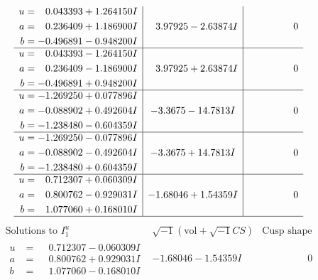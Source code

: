 \documentclass[1p]{elsarticle_modified}
\theoremstyle{definition}
\newcommand{\I}{\sqrt{-1}}
\begin{document}
$$\begin{array}{c|c|c}
\begin{aligned}
u &= \phantom{-}0.043393 + 1.264150 I \\
a &= \phantom{-}0.236409 + 1.186900 I \\
b &= -0.496891 - 0.948200 I\end{aligned}
 & \phantom{-}3.97925 - 2.63874 I & \phantom{-0.000000 } 0 \\ \hline\begin{aligned}
u &= \phantom{-}0.043393 - 1.264150 I \\
a &= \phantom{-}0.236409 - 1.186900 I \\
b &= -0.496891 + 0.948200 I\end{aligned}
 & \phantom{-}3.97925 + 2.63874 I & \phantom{-0.000000 } 0 \\ \hline\begin{aligned}
u &= -1.269250 + 0.077896 I \\
a &= -0.088902 + 0.492604 I \\
b &= -1.238480 - 0.604359 I\end{aligned}
 & -3.3675 - 14.7813 I & \phantom{-0.000000 } 0 \\ \hline\begin{aligned}
u &= -1.269250 - 0.077896 I \\
a &= -0.088902 - 0.492604 I \\
b &= -1.238480 + 0.604359 I\end{aligned}
 & -3.3675 + 14.7813 I & \phantom{-0.000000 } 0 \\ \hline\begin{aligned}
u &= \phantom{-}0.712307 + 0.060309 I \\
a &= \phantom{-}0.800762 - 0.929031 I \\
b &= \phantom{-}1.077060 + 0.168010 I\end{aligned}
 & -1.68046 + 1.54359 I & \phantom{-0.000000 } 0\\
 \hline 
 \end{array}$$\newpage$$\begin{array}{c|c|c}  
\text{Solutions to }I^u_{1}& \I (\text{vol} + \sqrt{-1}CS) & \text{Cusp shape}\\
 \hline 
\begin{aligned}
u &= \phantom{-}0.712307 - 0.060309 I \\
a &= \phantom{-}0.800762 + 0.929031 I \\
b &= \phantom{-}1.077060 - 0.168010 I\end{aligned}
 & -1.68046 - 1.54359 I & \phantom{-0.000000 } 0 \\ \hline\begin{aligned}

\end{aligned}
\end{array}$$
\end{document}
